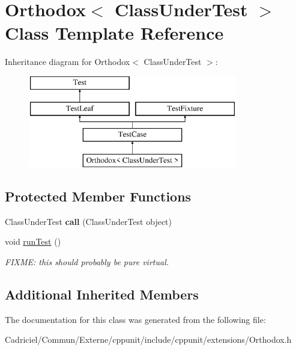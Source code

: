\hypertarget{class_orthodox}{\section{Orthodox$<$ Class\-Under\-Test $>$ Class Template Reference}
\label{class_orthodox}
}
Inheritance diagram for Orthodox$<$ Class\-Under\-Test $>$\-:\begin{figure}[H]
\begin{center}
\leavevmode
\includegraphics[height=4.000000cm]{class_orthodox}
\end{center}
\end{figure}
\subsection*{Protected Member Functions}
\begin{DoxyCompactItemize}
\item 
\hypertarget{class_orthodox_a08e9feb769578cb7a8b92c7c2c5d1874}{Class\-Under\-Test {\bfseries call} (Class\-Under\-Test object)}\label{class_orthodox_a08e9feb769578cb7a8b92c7c2c5d1874}

\item 
\hypertarget{class_orthodox_aaeaafea272fdce3b5b2f33882cb33d8c}{void \hyperlink{class_orthodox_aaeaafea272fdce3b5b2f33882cb33d8c}{run\-Test} ()}\label{class_orthodox_aaeaafea272fdce3b5b2f33882cb33d8c}

\begin{DoxyCompactList}\small\item\em F\-I\-X\-M\-E\-: this should probably be pure virtual. \end{DoxyCompactList}\end{DoxyCompactItemize}
\subsection*{Additional Inherited Members}


The documentation for this class was generated from the following file\-:\begin{DoxyCompactItemize}
\item 
Cadriciel/\-Commun/\-Externe/cppunit/include/cppunit/extensions/Orthodox.\-h\end{DoxyCompactItemize}
